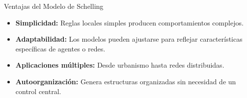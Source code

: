 \documentclass{beamer}
\begin{document}
\begin{frame}{Ventajas del Modelo de Schelling}
    \begin{itemize}
        \item \textbf{Simplicidad:} Reglas locales simples producen comportamientos complejos.
        \item \textbf{Adaptabilidad:} Los modelos pueden ajustarse para reflejar características específicas de agentes o redes.
        \item \textbf{Aplicaciones múltiples:} Desde urbanismo hasta redes distribuidas.
        \item \textbf{Autoorganización:} Genera estructuras organizadas sin necesidad de un control central.
    \end{itemize}
\end{frame}
\end{document}
